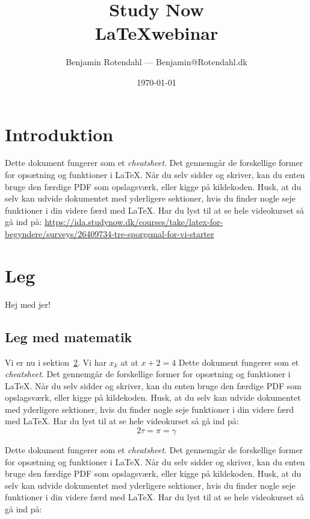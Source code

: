 \documentclass{article}
\title{
  \vspace{13em}
  \large{Study Now} \\
  \Large{\LaTeX webinar} \\
}
\author{
  Benjamin Rotendahl --- Benjamin@Rotendahl.dk
}
\date{
  \vspace{22em}
  \today
}
\begin{document}
\maketitle		%
\thispagestyle{empty}
\newpage

\section{Introduktion}
 Dette dokument fungerer som et \emph{cheatsheet}. Det gennemgår de forskellige
 former for opsætning og funktioner i \LaTeX. Når du selv sidder og skriver, kan
 du enten bruge den færdige PDF som opslagsværk, eller kigge på kildekoden.
 Husk, at du selv kan udvide dokumentet med yderligere sektioner, hvis du finder
 nogle seje funktioner i din videre færd med \LaTeX{}.
Har du lyst til at se hele videokurset så gå ind på:
\url{https://ida.studynow.dk/courses/take/latex-for-begyndere/surveys/26409734-tre-sporgsmal-for-vi-starter}



\section{Leg}\label{sec:leg}
 Hej med jer!
 \subsection{Leg med matematik}
   Vi er nu i sektion~\ref{sec:leg}. Vi har \(x_k\) at at \(x + 2 = 4\)
   Dette dokument fungerer som et \emph{cheatsheet}. Det gennemgår de forskellige
   former for opsætning og funktioner i \LaTeX. Når du selv sidder og skriver, kan
   du enten bruge den færdige PDF som opslagsværk, eller kigge på kildekoden.
   Husk, at du selv kan udvide dokumentet med yderligere sektioner, hvis du finder
   nogle seje funktioner i din videre færd med \LaTeX{}.
   Har du lyst til at se hele videokurset så gå ind på:
   \begin{equation}\label{eq:leg}
     2 \tau = \pi = \gamma
   \end{equation}

Dette dokument fungerer som et \emph{cheatsheet}. Det gennemgår de forskellige
former for opsætning og funktioner i \LaTeX. Når du selv sidder og skriver, kan
du enten bruge den færdige PDF som opslagsværk, eller kigge på kildekoden.
Husk, at du selv kan udvide dokumentet med yderligere sektioner, hvis du finder
nogle seje funktioner i din videre færd med \LaTeX{}.
Har du lyst til at se hele videokurset så gå ind på:
\end{document}
